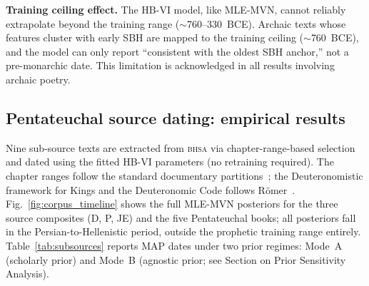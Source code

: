 \documentclass[10pt,letterpaper]{article}
\newcommand{\bhsa}{\textsc{bhsa}}
\newcommand{\mvn}{MLE-MVN}
\newcommand{\hbvi}{HB-VI}
\begin{document}
\textbf{Training ceiling effect.}  The \hbvi{} model, like \mvn{}, cannot
reliably extrapolate beyond the training range ($\sim$760--330~BCE).
Archaic texts whose features cluster with early SBH are mapped to the
training ceiling ($\sim$760~BCE), and the model can only report ``consistent
with the oldest SBH anchor,'' not a pre-monarchic date.  This limitation
is acknowledged in all results involving archaic poetry.

\subsection*{Pentateuchal source dating: empirical results}

Nine sub-source texts are extracted from \bhsa{} via chapter-range-based
selection and dated using the fitted \hbvi{} parameters (no retraining
required).  The chapter ranges follow the standard documentary
partitions~\cite{Baden2012,CarrFormation2011}; the Deuteronomistic
framework for Kings and the Deuteronomic Code follows
R{\"o}mer~\cite{Romer2005}.  Fig.~\ref{fig:corpus_timeline} shows the
full MLE-MVN posteriors for the three source composites (D, P, JE) and
the five Pentateuchal books; all posteriors fall in the Persian-to-Hellenistic
period, outside the prophetic training range entirely.
Table~\ref{tab:subsources} reports MAP dates under two prior regimes:
Mode~A (scholarly prior) and Mode~B (agnostic prior; see Section on
Prior Sensitivity Analysis).
\end{document}
